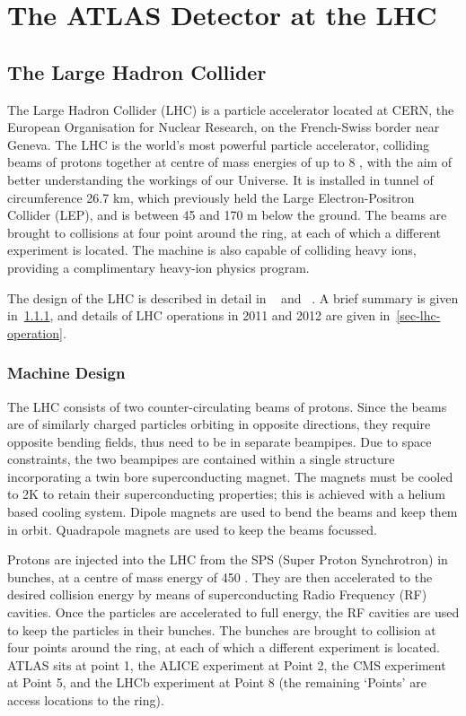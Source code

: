 \graphicspath{{Chapters/Detector/Figures/}}
\chapter{The ATLAS Detector at the LHC}
\label{chap:Detector}

\section{The Large Hadron Collider}

The Large Hadron Collider (LHC) is a particle accelerator located at CERN, the
European Organisation for Nuclear Research, on the French-Swiss border near
Geneva. The LHC is the world's most powerful particle accelerator, colliding beams of
protons together at centre of mass energies of up to 8 \TeV, with the aim of
better understanding the workings of our Universe. It is installed in
tunnel of circumference 26.7 km, which previously held the Large
Electron-Positron Collider (LEP), and is between 45 and 170 m below the ground.
The beams are brought to collisions at four point around the ring, at each of
which a different experiment is located. The machine is also capable of colliding heavy ions, providing a complimentary heavy-ion physics program.

The design of the LHC is described in detail in ~\cite{1748-0221-3-08-S08001}
and ~\cite{Brüning:782076}. A brief summary is given in~\ref{sec-lhc-design},
and details of LHC operations in 2011 and 2012 are given
in~\ref{sec-lhc-operation}.

\subsection{Machine Design}
\label{sec-lhc-design}

The LHC consists of two counter-circulating beams of protons. 
Since the beams are of similarly charged particles
orbiting in opposite directions, they require opposite bending fields, thus need
to be in separate beampipes. Due to space constraints, the two beampipes are
contained within a single structure incorporating a twin bore superconducting
magnet. The magnets must be cooled to 2K to retain their superconducting
properties; this is achieved with a helium based cooling system. Dipole magnets are
used to bend the beams and keep them in orbit. Quadrapole magnets are used to
keep the beams focussed. 

Protons are injected into the LHC from the SPS (Super Proton Synchrotron) in
bunches, at a centre of mass energy of 450 \GeV. They are then accelerated to the desired
collision energy by means of superconducting Radio Frequency (RF) cavities. Once the
particles are accelerated to full energy, the RF cavities are used to keep the
particles in their bunches. The bunches are brought to collision at four points
around the ring, at each of which a different experiment is located. ATLAS sits at
point 1, the ALICE experiment at Point 2, the CMS experiment at Point 5, and the
LHCb experiment at Point 8 (the remaining `Points' are access locations to the
ring).

